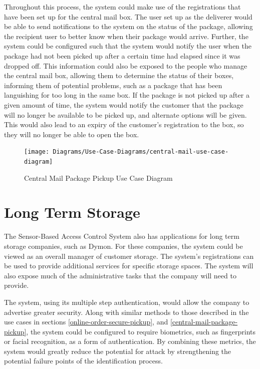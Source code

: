 \documentclass[12pt]{report}
\let\Oldsection\section
\renewcommand{\section}{\FloatBarrier\Oldsection}
\begin{document}
Throughout this process, the system could make use of the registrations that have been set up for the central mail
box. The user set up as the deliverer would be able to send notifications to the system on the status of the package, allowing
the recipient user to better know when their package would arrive. Further, the system could be configured such that the
system would notify the user when the package had not been picked up after a certain time had elapsed since it was
dropped off. This information could also be exposed to the people who manage the central mail box, allowing them to
determine the status of their boxes, informing them of potential problems, such as a package that has been languishing
for too long in the same box. If the package is not picked up after a given amount of time, the system would notify the
customer that the package will no longer be available to be picked up, and alternate options will be given. This would
also lead to an expiry of the customer's registration to the box, so they will no longer be able to open the box.

\begin{figure}
    \texttt{[image: Diagrams/Use-Case-Diagrams/central-mail-use-case-diagram]}
    \caption{Central Mail Package Pickup Use Case Diagram}
    \label{fig:central-mail-use-case-diagram}
\end{figure}


\section{Long Term Storage} \label{long-term-storage}

The Sensor-Based Access Control System also has applications for long term storage companies, such as Dymon. For these 
companies, the system could be viewed as an overall manager of customer storage. The system's registrations can be used 
to provide additional services for specific storage spaces. The system will also expose much of the administrative 
tasks that the company will need to provide.

The system, using its multiple step authentication, would allow the company to advertise greater security. Along with
similar methods to those described in the use cases in sections \ref{online-order-secure-pickup}, and
\ref{central-mail-package-pickup}, the system could be configured to require biometrics, such
as fingerprints or facial recognition, as a form of authentication. By combining these metrics, the system would greatly
reduce the potential for attack by strengthening the potential failure points of the identification process.
\end{document}
